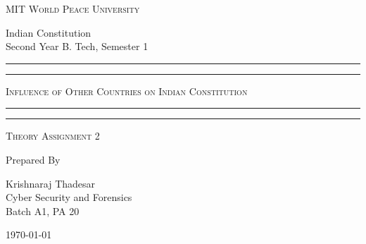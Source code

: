 \documentclass[11pt]{article}
\begin{document}
\begin{titlepage}
	\centering


	\huge\textsc{
		MIT World Peace University
	}\\

	\vspace{0.75\baselineskip} %

	\LARGE{
		Indian Constitution\\
		Second Year B. Tech, Semester 1
	}

	\vfill %


	\rule{\textwidth}{1.6pt}\vspace*{-\baselineskip}\vspace*{2pt}
	\rule{\textwidth}{0.6pt}
	\vspace{0.75\baselineskip} %



	\huge{\textsc{
			Influence of Other Countries on Indian Constitution
		}} \\



	\vspace{0.5\baselineskip} %
	\rule{\textwidth}{0.6pt}\vspace*{-\baselineskip}\vspace*{2.8pt}
	\rule{\textwidth}{1.6pt}

	\vspace{1\baselineskip} %


	\LARGE\textsc{
		Theory Assignment 2
	} %
	\vfill


	Prepared By
	\vspace{0.5\baselineskip} %

	\Large{
		Krishnaraj Thadesar \\
		Cyber Security and Forensics\\
		Batch A1, PA 20
	}


	\vspace{0.5\baselineskip} %
	\today

\end{titlepage}
\end{document}
